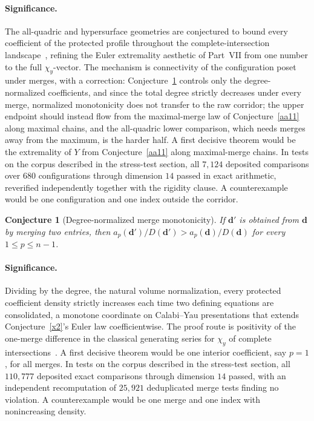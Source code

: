\documentclass[11pt]{article}
\newtheorem{conjecture}{Conjecture}
\theoremstyle{definition}
\begin{document}
\paragraph{Significance.}
The all-quadric and hypersurface geometries are conjectured to bound every coefficient of the protected profile throughout the complete-intersection landscape~\cite{He21}, refining the Euler extremality aesthetic of Part~VII from one number to the full $\chi_y$-vector.  The mechanism is connectivity of the configuration poset under merges, with a correction: Conjecture~\ref{aa10} controls only the degree-normalized coefficients, and since the total degree strictly decreases under every merge, normalized monotonicity does not transfer to the raw corridor; the upper endpoint should instead flow from the maximal-merge law of Conjecture~\ref{aa11} along maximal chains, and the all-quadric lower comparison, which needs merges away from the maximum, is the harder half.  A first decisive theorem would be the extremality of $Y$ from Conjecture~\ref{aa11} along maximal-merge chains.  In tests on the corpus described in the stress-test section, all $7{,}124$ deposited comparisons over $680$ configurations through dimension $14$ passed in exact arithmetic, reverified independently together with the rigidity clause.  A counterexample would be one configuration and one index outside the corridor.

\begin{conjecture}[Degree-normalized merge monotonicity]\label{aa10}
If $\mathbf d'$ is obtained from $\mathbf d$ by merging two entries, then $a_p(\mathbf d')/D(\mathbf d')>a_p(\mathbf d)/D(\mathbf d)$ for every $1\le p\le n-1$.
\end{conjecture}

\paragraph{Significance.}
Dividing by the degree, the natural volume normalization, every protected coefficient density strictly increases each time two defining equations are consolidated, a monotone coordinate on Calabi--Yau presentations that extends Conjecture~\ref{x2}'s Euler law coefficientwise.  The proof route is positivity of the one-merge difference in the classical generating series for $\chi_y$ of complete intersections~\cite{Hir66}.  A first decisive theorem would be one interior coefficient, say $p=1$, for all merges.  In tests on the corpus described in the stress-test section, all $110{,}777$ deposited exact comparisons through dimension $14$ passed, with an independent recomputation of $25{,}921$ deduplicated merge tests finding no violation.  A counterexample would be one merge and one index with nonincreasing density.
\end{document}
